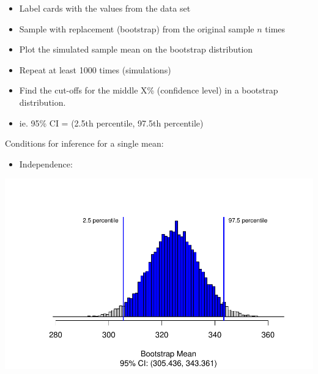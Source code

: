 \documentclass[
]{report}
\newenvironment{Shaded}{\begin{snugshade}}{\end{snugshade}}
\newcommand{\AttributeTok}[1]{\textcolor[rgb]{0.13,0.29,0.53}{#1}}
\newcommand{\DecValTok}[1]{\textcolor[rgb]{0.00,0.00,0.81}{#1}}
\newcommand{\FloatTok}[1]{\textcolor[rgb]{0.00,0.00,0.81}{#1}}
\newcommand{\FunctionTok}[1]{\textcolor[rgb]{0.13,0.29,0.53}{\textbf{#1}}}
\newcommand{\NormalTok}[1]{#1}
\newcommand{\SpecialCharTok}[1]{\textcolor[rgb]{0.81,0.36,0.00}{\textbf{#1}}}
\newcommand{\StringTok}[1]{\textcolor[rgb]{0.31,0.60,0.02}{#1}}
\providecommand{\tightlist}{%
  \setlength{\itemsep}{0pt}\setlength{\parskip}{0pt}}
\begin{document}
\begin{itemize}
\item
  Label cards with the values from the data set
\item
  Sample with replacement (bootstrap) from the original sample \(n\) times
\item
  Plot the simulated sample mean on the bootstrap distribution
\item
  Repeat at least 1000 times (simulations)
\item
  Find the cut-offs for the middle X\% (confidence level) in a bootstrap distribution.
\item
  ie. 95\% CI = (2.5th percentile, 97.5th percentile)
\end{itemize}

Conditions for inference for a single mean:

\begin{itemize}
\tightlist
\item
  Independence:
\end{itemize}

\vspace{0.5in}

\begin{Shaded}
\end{Shaded}

\begin{center}\includegraphics[width=0.7\linewidth]{07-VN07-one_meantheory_files/figure-latex/unnamed-chunk-4-1} \end{center}
\end{document}
